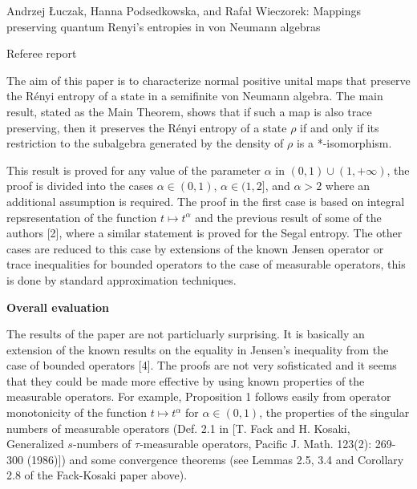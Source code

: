\documentclass[12pt]{article}
\begin{document}
\begin{center}
{\large Andrzej {\L}uczak, Hanna Podsedkowska, and Rafa{\l} Wieczorek: Mappings preserving quantum Renyi’s entropies in von Neumann algebras}

\end{center}
\medskip

\centerline{Referee report}

\bigskip

The aim of this paper is to characterize normal positive unital maps that preserve the
R\'enyi entropy of a state in a semifinite von Neumann algebra. The main result, stated as
the Main Theorem, shows that if such a map is also trace preserving, then it preserves the
R\'enyi entropy of a state $\rho$ if and only if its restriction to the subalgebra
generated by the density of $\rho$ is a *-isomorphism. 

This result is proved for any value of the parameter $\alpha$ in $(0,1)\cup (1,+\infty)$,
the proof is divided into the cases $\alpha\in (0,1)$, $\alpha\in (1,2]$, and $\alpha>2$
where an additional assumption is required. The proof in the first case is  based on
integral repsresentation of the function $t\mapsto t^\alpha$ and  the previous result of
some of the authors [2], where a similar statement is proved for the Segal entropy.
The other cases are reduced to this case by extensions of the known Jensen
operator or trace inequalities for bounded operators  to the case of measurable
operators, this is done  by standard approximation techniques. 



\medskip

\noindent
\textbf{Overall evaluation}

\medskip

The results of the paper are not particluarly surprising. It is basically an extension of
the known results on the equality in Jensen's inequality from the case of bounded
operators [4]. The proofs are not very sofisticated and it seems that they could be made
more effective by using known properties of the measurable operators. For example,
Proposition 1 follows easily from operator monotonicity of the function $t\mapsto
t^\alpha$ for $\alpha\in (0,1)$, the properties of the singular numbers of measurable
operators (Def. 2.1 in [T. Fack and H. Kosaki, Generalized $s$-numbers of
$\tau$-measurable operators, Pacific J. Math. 123(2): 269-300 (1986)]) and some
convergence theorems (see Lemmas 2.5, 3.4 and Corollary 2.8 of the Fack-Kosaki paper
above). 
\end{document}
